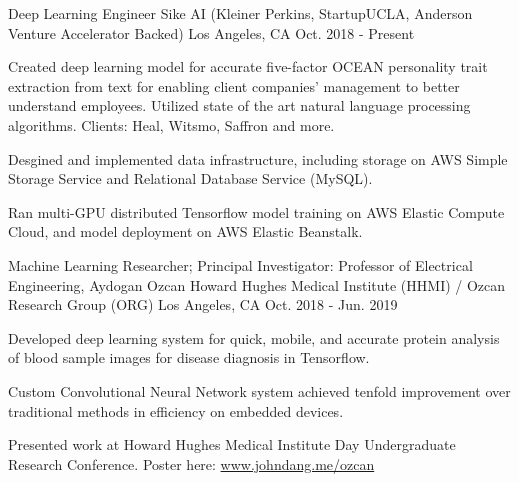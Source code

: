 \begin{cventries}
  \cventry
    {Deep Learning Engineer} %
    {Sike AI (Kleiner Perkins, StartupUCLA, Anderson Venture Accelerator Backed)} %
    {Los Angeles, CA} %
    {Oct. 2018 - Present} %
    {
      \begin{cvitems} %
        \item {Created deep learning model for accurate five-factor OCEAN personality trait extraction from text for enabling 
        client companies' management to better understand employees. Utilized state of the art 
        natural language processing algorithms. Clients: Heal, Witsmo, Saffron and more.}
        \item {Desgined and implemented data infrastructure, including storage on AWS Simple Storage Service
         and Relational Database Service (MySQL).
        \item Ran multi-GPU distributed Tensorflow model training on AWS Elastic Compute Cloud, and model deployment on AWS Elastic Beanstalk.}
      \end{cvitems}
    }

  \cventry
    {Machine Learning Researcher; Principal Investigator: Professor of Electrical Engineering, Aydogan Ozcan} %
    {Howard Hughes Medical Institute (HHMI) / Ozcan Research Group (ORG)} %
    {Los Angeles, CA} %
    {Oct. 2018 - Jun. 2019} %
    {
      \begin{cvitems} %
        \item {Developed deep learning system for quick, mobile, and accurate protein analysis of blood sample images for disease diagnosis in Tensorflow.}
        \item {Custom Convolutional Neural Network system achieved tenfold improvement over traditional methods in efficiency on embedded devices.}
        \item Presented work at Howard Hughes Medical Institute Day Undergraduate Research Conference. Poster here: \href{https://www.johndang.me/ozcan}{www.johndang.me/ozcan}
      \end{cvitems}
    }


\end{cventries}
